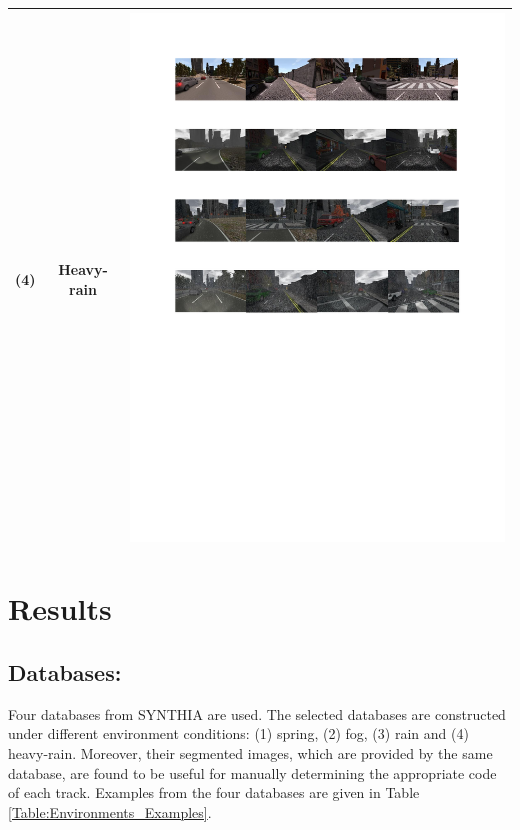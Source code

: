 \documentclass[conference]{IEEEtran}
\begin{document}
\begin{table}[!t]
\begin{tabular}{|C{1cm}|c|C{13.5cm}|}
				(4)	& Heavy- rain & \begin{minipage}{.9\textwidth}\includegraphics[scale=.8,trim=2cm 12.5cm 2cm 14.3cm,clip]{examples.pdf}\end{minipage} \\ \hline
			\end{tabular}
		\end{table}

\section{Results}
\subsection{Databases:} 
	Four databases from SYNTHIA \cite{Ros2016TheSYNTHIA} are used. The selected databases are constructed under different environment conditions: (1) spring, (2) fog, (3) rain and (4) heavy-rain. Moreover, their segmented images, which are provided by the same database, are found to be useful for manually determining the appropriate code of each track. Examples from the four databases are given in Table \ref{Table:Environments_Examples}.	
\end{document}
